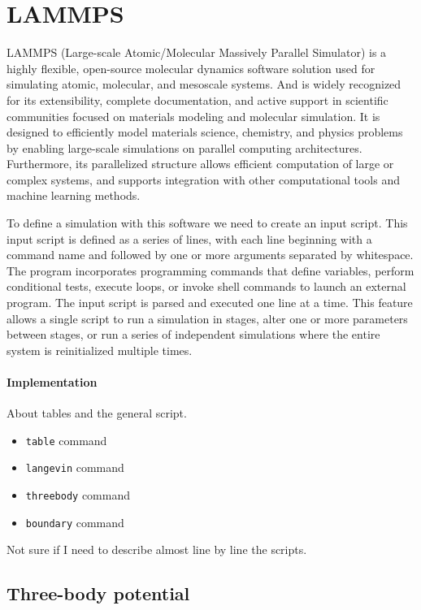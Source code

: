 \section{LAMMPS}

LAMMPS (Large-scale Atomic/Molecular Massively Parallel Simulator) is a highly flexible, open-source molecular dynamics software solution used for simulating atomic, molecular, and mesoscale systems. 
And is widely recognized for its extensibility, complete documentation, and active support in scientific communities focused on materials modeling and molecular simulation.
It is designed to efficiently model materials science, chemistry, and physics problems by enabling large-scale simulations on parallel computing architectures.
Furthermore, its parallelized structure allows efficient computation of large or complex systems, and supports integration with other computational tools and machine learning methods.

To define a simulation with this software we need to create an input script.
This input script is defined as a series of lines, with each line beginning with a command name and followed by one or more arguments separated by whitespace.
The program incorporates programming commands that define variables, perform conditional tests, execute loops, or invoke shell commands to launch an external program.
The input script is parsed and executed one line at a time. 
This feature allows a single script to run a simulation in stages, alter one or more parameters between stages, or run a series of independent simulations where the entire system is reinitialized multiple times.

\paragraph{Implementation} About tables and the general script.


\begin{itemize}
    \item \verb|table| command
    \item \verb|langevin| command
    \item \verb|threebody| command
    \item \verb|boundary| command
\end{itemize}

Not sure if I need to describe almost line by line the scripts.


\subsection{Three-body potential}

